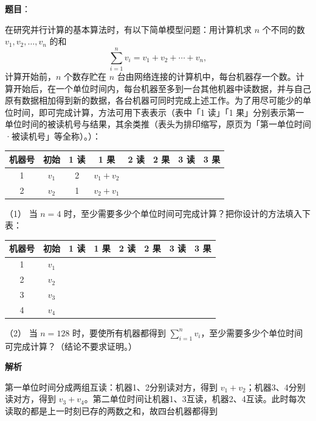 \begin{answer}

\textbf{题目}：

在研究并行计算的基本算法时，有以下简单模型问题：用计算机求 \(n\) 个不同的数 \(v_1,v_2,\ldots,v_n\) 的和
\nopagebreak[4]
\[
\sum_{i=1}^n v_i=v_1+v_2+\cdots+v_n,
\]
计算开始前，\(n\) 个数存贮在 \(n\) 台由网络连接的计算机中，每台机器存一个数。计算开始后，在一个单位时间内，每台机器至多到一台其他机器中读数据，并与自己原有数据相加得到新的数据，各台机器可同时完成上述工作。为了用尽可能少的单位时间，即可完成计算，方法可用下表表示（表中「1 读」「1 果」分别表示第一单位时间的被读机号与结果，其余类推（表头为排印缩写，原页为「第一单位时间·被读机号」等全称）。）：

\begin{center}
\begingroup\setlength{\tabcolsep}{4pt}
\begin{tabular}{cccccccc}
\toprule
机器号 & 初始 & 1 读 & 1 果 & 2 读 & 2 果 & 3 读 & 3 果 \\
\midrule
1 & \(v_1\) & 2 & \(v_1+v_2\) &  &  &  &  \\
2 & \(v_2\) & 1 & \(v_2+v_1\) &  &  &  &  \\
\bottomrule
\end{tabular}
\endgroup
\end{center}

（1） 当 \(n=4\) 时，至少需要多少个单位时间可完成计算？把你设计的方法填入下表：

\begin{center}
\begingroup\setlength{\tabcolsep}{4pt}
\begin{tabular}{cccccccc}
\toprule
机器号 & 初始 & 1 读 & 1 果 & 2 读 & 2 果 & 3 读 & 3 果 \\
\midrule
1 & \(v_1\) &  &  &  &  &  &  \\
2 & \(v_2\) &  &  &  &  &  &  \\
3 & \(v_3\) &  &  &  &  &  &  \\
4 & \(v_4\) &  &  &  &  &  &  \\
\bottomrule
\end{tabular}
\endgroup
\end{center}

（2） 当 \(n=128\) 时，要使所有机器都得到 \(\sum_{i=1}^{n}v_i\)，至少需要多少个单位时间可完成计算？（结论不要求证明。）

\textbf{解析}


第一单位时间分成两组互读：机器1、2分别读对方，得到 $v_1+v_2$；机器3、4分别读对方，得到 $v_3+v_4$。第二单位时间让机器1、3互读，机器2、4互读。此时每次读取的都是上一时刻已存的两数之和，故四台机器都得到


\end{answer}
